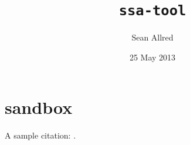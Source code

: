 \documentclass{cs-smp}[2013/12/23]
\title
                         {\texttt{ssa-tool}}%
            [A Utility for the Creation and Evaluation \\
                   of Self-Stabilizing Algorithms]
\author
                            {Sean Allred}%
                           [Alan Jamieson]
\date
                            {25 May 2013}
\begin{document}
\maketitle
\begin{abstract}
  
\end{abstract}
\printbibliography
\appendix


\section{sandbox}
A sample citation: \autocites[26.1--26.45]{atallah2009algorithms}{Chen1991147}.
\end{document}
